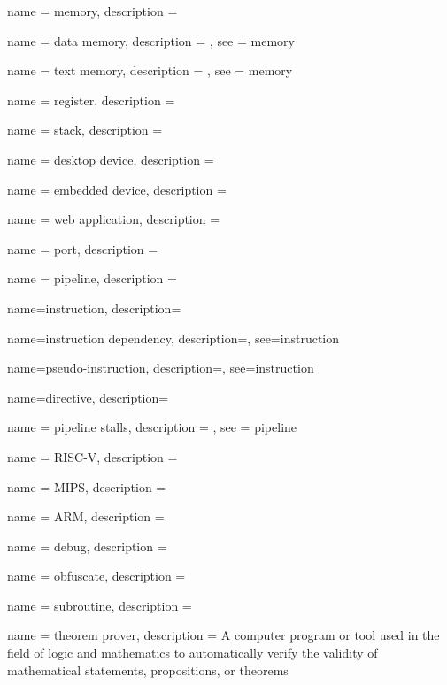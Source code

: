 {
  name = {memory},
  description = {}
}

 {
  name = {data memory},
  description = {},
  see = {memory}
}

 {
  name = {text memory},
  description = {},
  see = {memory}
}

 {
  name = {register},
  description = {}
}

 {
  name = {stack},
  description = {}
}

 {
  name = {desktop device},
  description = {}
}

 {
  name = {embedded device},
  description = {}
}

 {
  name = {web application},
  description = {}
}

 {
  name = {port},
  description = {}
}

 {
  name = {pipeline},
  description = {}
}

 {
  name={instruction},
  description={}
}

 {
  name={instruction dependency},
  description={},
  see={instruction}
}

 {
  name={pseudo-instruction},
  description={},
  see={instruction}
}

 {
  name={directive},
  description={}
}

 {
  name = {pipeline stalls},
  description = {},
  see = {pipeline}
}

 {
  name = {RISC-V},
  description = {}
}

 {
  name = {MIPS},
  description = {}
}

 {
  name = {ARM},
  description = {}
}

 {
  name = {debug},
  description = {}
}

 {
  name = {obfuscate},
  description = {}
}

 {
  name = {subroutine},
  description = {}
}

 {
  name = {theorem prover},
  description = {A computer program or tool used in the field of logic and mathematics to automatically verify the validity of mathematical statements, propositions, or theorems}
}

